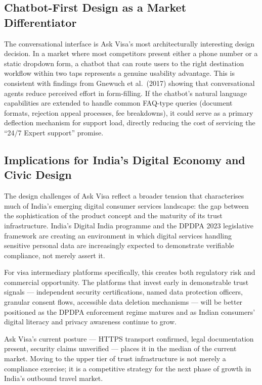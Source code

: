 \documentclass[journal, 10pt, twoside]{IEEEtran}
\begin{document}
\subsection{Chatbot-First Design as a Market Differentiator}
The conversational interface is Ask Visa's most architecturally interesting
design decision. In a market where most competitors present either a phone
number or a static dropdown form, a chatbot that can route users to the
right destination workflow within two taps represents a genuine usability
advantage. This is consistent with findings from Gnewuch et al.\ (2017)
showing that conversational agents reduce perceived effort in form-filling.
If the chatbot's natural language capabilities are extended to handle common
FAQ-type queries (document formats, rejection appeal processes, fee
breakdowns), it could serve as a primary deflection mechanism for support
load, directly reducing the cost of servicing the ``24/7 Expert support''
promise.

\subsection{Implications for India's Digital Economy and Civic Design}
The design challenges of Ask Visa reflect a broader tension that characterises
much of India's emerging digital consumer services landscape: the gap between
the sophistication of the product concept and the maturity of its trust
infrastructure. India's Digital India programme and the DPDPA 2023
legislative framework are creating an environment in which digital services
handling sensitive personal data are increasingly expected to demonstrate
verifiable compliance, not merely assert it.

For visa intermediary platforms specifically, this creates both regulatory
risk and commercial opportunity. The platforms that invest early in
demonstrable trust signals --- independent security certifications, named
data protection officers, granular consent flows, accessible data deletion
mechanisms --- will be better positioned as the DPDPA enforcement regime
matures and as Indian consumers' digital literacy and privacy awareness
continue to grow.

Ask Visa's current posture --- HTTPS transport confirmed, legal documentation
present, security claims unverified --- places it in the median of the
current market. Moving to the upper tier of trust infrastructure is not
merely a compliance exercise; it is a competitive strategy for the next
phase of growth in India's outbound travel market.
\end{document}
